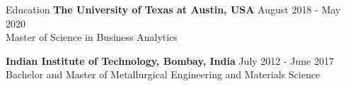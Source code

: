 \documentclass{resume} %
\begin{document}
\begin{rSection}{Education}
                        \textbf{The University of Texas at Austin, USA} \hfill {August 2018 - May 2020} \\
                            {Master of Science in Business Analytics}
                         
             
         
                        \textbf{Indian Institute of Technology, Bombay, India} \hfill {July 2012 - June 2017} \\
                            {Bachelor and Master of Metallurgical Engineering and Materials Science}
                         
             
         
    \end{rSection}
\end{document}
